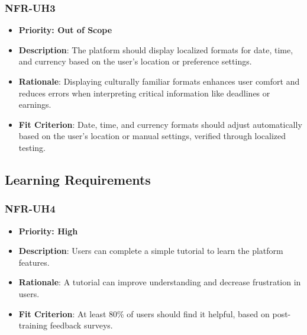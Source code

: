 \documentclass[12pt]{article}
\begin{document}
        \subsubsection*{NFR-UH3} 
        \label{sec:UH3}
        \begin{itemize}
          \item \textbf{Priority: Out of Scope}
            \item \textbf{Description}: The platform should display localized formats for date, time, and currency based on the user's location or preference settings.  
            \item \textbf{Rationale}: Displaying culturally familiar formats enhances user comfort and reduces errors when interpreting critical information like deadlines or earnings.  
            \item \textbf{Fit Criterion}: Date, time, and currency formats should adjust automatically based on the user’s location or manual settings, verified through localized testing.
        \end{itemize}


\subsection{Learning Requirements}


\subsubsection*{NFR-UH4} 
\label{sec:UH4}
        \begin{itemize} 
          \item \textbf{Priority: High}
            \item \textbf{Description}: Users can complete a simple tutorial to learn the platform features.  
            \item \textbf{Rationale}: A tutorial can improve understanding and decrease frustration in users.  
            \item \textbf{Fit Criterion}: At least 80\% of users should find it helpful, based on post-training feedback surveys.
        \end{itemize}
\end{document}
